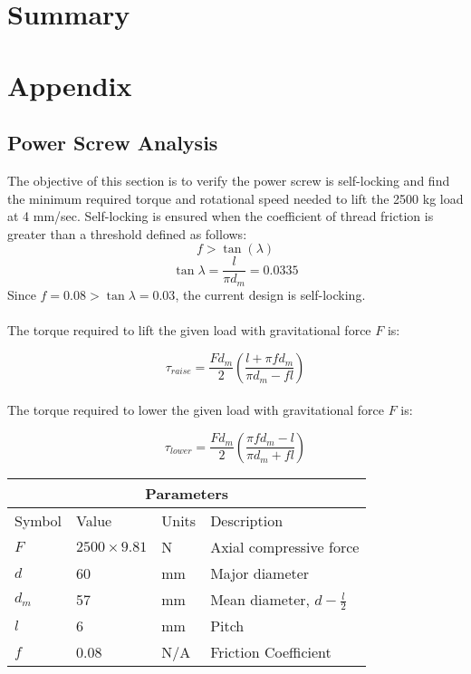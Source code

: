 \documentclass[letterpaper,12pt]{article}
\begin{document}
\section{Summary}

\newpage

\section{Appendix}

\subsection{Power Screw Analysis}

The objective of this section is to verify the power screw is self-locking and find the minimum required torque and rotational speed needed to lift the 2500 kg load at 4 mm/sec.
Self-locking is ensured when the coefficient of thread friction is greater than a threshold defined as follows:
\begin{equation}
f > \tan(\lambda)
\end{equation}
$$\tan\lambda = \frac{l}{\pi d_m} = 0.0335$$
Since $f = 0.08 > \tan\lambda = 0.03$, the current design is self-locking. \\
\\
The torque required to lift the given load with gravitational force $F$ is:

\begin{equation}
\tau_{raise} = \frac{Fd_m}{2}\left(\frac{l+\pi f d_m}{\pi d_m - fl}\right)
\end{equation}
\\
The torque required to lower the given load with gravitational force $F$ is:

\begin{equation}
\tau_{lower} = \frac{Fd_m}{2}\left(\frac{\pi f d_m-l}{\pi d_m + fl}\right)
\end{equation}


\begin{center}
	\begin{tabular}{ |p{2cm}||p{3cm}|p{2cm}|p{7cm}|  }
		\hline
		\multicolumn{4}{|c|}{Parameters} \\
		\hline
		Symbol& Value & Units & Description\\
		\hline
		$F$ & $2500 \times 9.81$ & N & Axial compressive force\\
        $d$ & 60 & mm   & Major diameter\\			
		$d_m$ & 57 & mm   & Mean diameter, $d - \frac{l}{2}$\\
		$l$ & 6 & mm &  Pitch\\
		$f$ & 0.08 & N/A & Friction Coefficient\\
		\hline
	\end{tabular}
\end{center}
\end{document}
